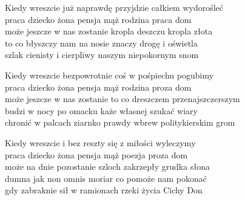 \begin{text}
    Kiedy wreszcie już naprawdę przyjdzie całkiem wydorośleć\\
    praca dziecko żona pensja mąż rodzina praca dom\\
    może jeszcze w nas zostanie kropla deszczu kropla złota\\
    to co błyszczy nam na nosie znaczy drogę i oświetla\\
    szlak cienisty i cierpliwy naszym niepokornym snom

    Kiedy wreszcie bezpowrotnie coś w pośpiechu pogubimy\\
    praca dziecko żona pensja mąż rodzina proza dom\\
    może jeszcze w nas zostanie to co dreszczem przenajszczerszym\\
    budzi w nocy po omacku każe własnej szukać wiary\\
    chronić w palcach ziarnko prawdy wbrew politykierskim grom

    Kiedy wreszcie i bez reszty się z miłości wyleczymy\\
    praca dziecko żona pensja mąż poezja proza dom\\
    może na dnie pozostanie szloch zakrzepły grudka słona\\
    dumna jak non omnis moriar co pomoże nam pokonać\\
    gdy zabraknie sił w ramionach rzeki życia Cichy Don
\end{text}
\begin{chord}

\end{chord}
